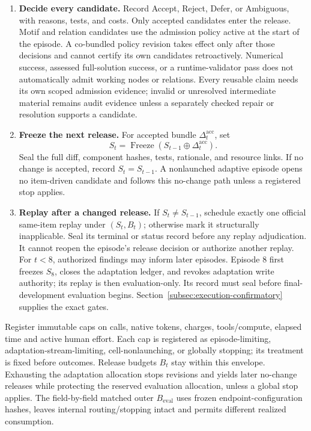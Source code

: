 \documentclass[10pt]{article} %
\providecommand{\1}{\mathbf{1}}  %
\theoremstyle{remark}
\theoremstyle{definition}
\begin{document}
\begin{enumerate}[leftmargin=*,itemsep=4pt,topsep=4pt]
\item \textbf{Decide every candidate.}
Record Accept, Reject, Defer, or Ambiguous, with reasons, tests, and costs.
Only accepted candidates enter the release. Motif and relation candidates
use the admission policy active at the start of the episode. A co-bundled
policy revision takes effect only after those decisions and cannot certify
its own candidates retroactively. Numerical success, assessed full-solution
success, or a runtime-validator pass does not automatically admit working
nodes or relations. Every reusable claim needs its own scoped admission
evidence; invalid or unresolved intermediate material remains audit evidence
unless a separately checked repair or resolution supports a candidate.

\item \textbf{Freeze the next release.}
For accepted bundle $\Delta_t^{\mathrm{acc}}$, set
\begin{equation}
S_t=\operatorname{Freeze}\!\left(S_{t-1}\oplus\Delta_t^{\mathrm{acc}}\right).
\label{eq:pilot-version-transition}
\end{equation}
Seal the full diff, component hashes, tests, rationale, and resource links.
If no change is accepted, record $S_t=S_{t-1}$. A nonlaunched adaptive episode
opens no item-driven candidate and follows this no-change path unless a
registered stop applies.

\item \textbf{Replay after a changed release.}
If $S_t\neq S_{t-1}$, schedule exactly one official same-item replay under
$(S_t,B_t)$; otherwise mark it structurally inapplicable. Seal its terminal
or status record before any replay adjudication. It cannot reopen the
episode's release decision or authorize another replay. For $t<8$, authorized
findings may inform later episodes. Episode 8 first freezes $S_8$, closes
the adaptation ledger, and revokes adaptation write authority; its replay
is then evaluation-only. Its record must seal before final-development
evaluation begins. Section~\ref{subsec:execution-confirmatory} supplies
the exact gates.
\end{enumerate}

Register immutable caps on calls, native tokens, charges, tools/compute,
elapsed time and active human effort. Each cap is registered as
episode-limiting, adaptation-stream-limiting, cell-nonlaunching, or globally
stopping; its treatment is fixed before outcomes. Release budgets $B_t$ stay
within this envelope. Exhausting the adaptation allocation stops revisions
and yields later no-change releases while protecting the reserved evaluation
allocation, unless a global stop applies. The field-by-field matched outer
$B_{\mathrm{eval}}$ uses frozen endpoint-configuration hashes, leaves internal
routing/stopping intact and permits different realized consumption.
\end{document}

